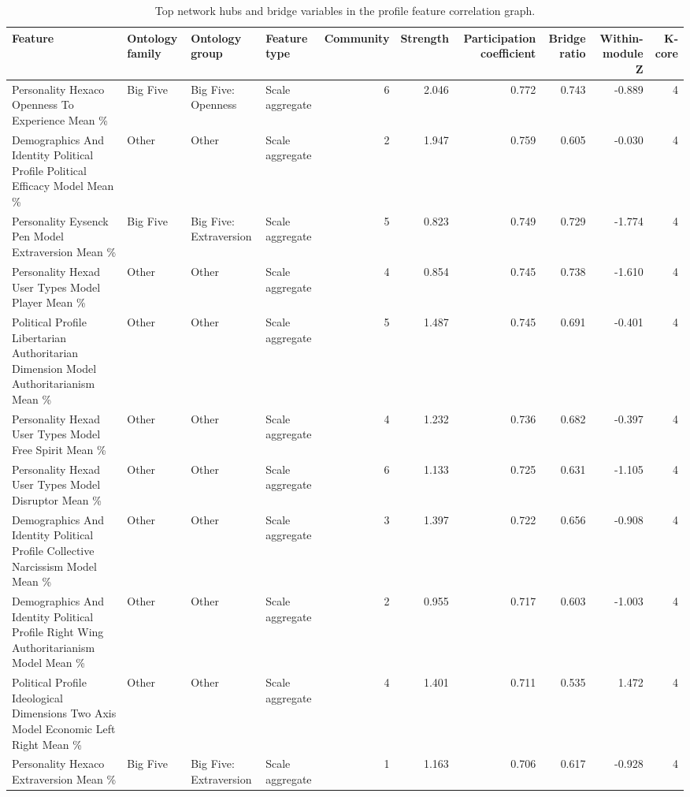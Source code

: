 \begin{table}[htbp]
\centering
\begin{threeparttable}
\caption{Top network hubs and bridge variables in the profile feature correlation graph.}
\label{tab:networksummary}
\small
\setlength{\tabcolsep}{4.5pt}
\renewcommand{\arraystretch}{1.10}
\begin{adjustbox}{max width=\linewidth}
\begin{tabular}{llllrrrrrr}
\toprule
Feature & Ontology family & Ontology group & Feature type & Community & Strength & Participation coefficient & Bridge ratio & Within-module Z & K-core \\
\midrule
Personality Hexaco Openness To Experience Mean \% & Big Five & Big Five: Openness & Scale aggregate & 6 & 2.046 & 0.772 & 0.743 & -0.889 & 4 \\
Demographics And Identity Political Profile Political Efficacy Model Mean \% & Other & Other & Scale aggregate & 2 & 1.947 & 0.759 & 0.605 & -0.030 & 4 \\
Personality Eysenck Pen Model Extraversion Mean \% & Big Five & Big Five: Extraversion & Scale aggregate & 5 & 0.823 & 0.749 & 0.729 & -1.774 & 4 \\
Personality Hexad User Types Model Player Mean \% & Other & Other & Scale aggregate & 4 & 0.854 & 0.745 & 0.738 & -1.610 & 4 \\
Political Profile Libertarian Authoritarian Dimension Model Authoritarianism Mean \% & Other & Other & Scale aggregate & 5 & 1.487 & 0.745 & 0.691 & -0.401 & 4 \\
Personality Hexad User Types Model Free Spirit Mean \% & Other & Other & Scale aggregate & 4 & 1.232 & 0.736 & 0.682 & -0.397 & 4 \\
Personality Hexad User Types Model Disruptor Mean \% & Other & Other & Scale aggregate & 6 & 1.133 & 0.725 & 0.631 & -1.105 & 4 \\
Demographics And Identity Political Profile Collective Narcissism Model Mean \% & Other & Other & Scale aggregate & 3 & 1.397 & 0.722 & 0.656 & -0.908 & 4 \\
Demographics And Identity Political Profile Right Wing Authoritarianism Model Mean \% & Other & Other & Scale aggregate & 2 & 0.955 & 0.717 & 0.603 & -1.003 & 4 \\
Political Profile Ideological Dimensions Two Axis Model Economic Left Right Mean \% & Other & Other & Scale aggregate & 4 & 1.401 & 0.711 & 0.535 & 1.472 & 4 \\
Personality Hexaco Extraversion Mean \% & Big Five & Big Five: Extraversion & Scale aggregate & 1 & 1.163 & 0.706 & 0.617 & -0.928 & 4 \\

\end{tabular}
\end{adjustbox}
\end{threeparttable}
\end{table}
